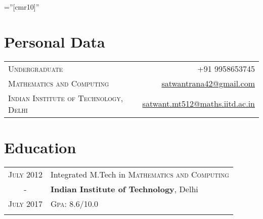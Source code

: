 \documentclass[a4paper,10pt]{article} %
\begin{document}
\pagestyle{empty} %

\font\fb=''[cmr10]'' %


\par{\bigskip\par} %

\section{Personal Data}

\begin{tabular}{lr}
\textsc{Undergraduate} &\textsc{+91 9958653745}\\
\textsc{Mathematics and Computing } & \href{mailto:satwantrana42@gmail.com}{satwantrana42@gmail.com}\\
\textsc{Indian Institute of Technology, Delhi\ \ \ \ \ \ \ \ \ \ \ \ \ \ \ \ } & \href{mailto:satwant.mt512@maths.iitd.ac.in}{satwant.mt512@maths.iitd.ac.in}
\end{tabular}


\section{Education}

\begin{tabular}{cl}	

\textsc{July} 2012 & Integrated M.Tech in \textsc{}\textsc{Mathematics and Computing} \\
- &\textbf{Indian Institute of Technology}, Delhi\\
\textsc{July} 2017 &\normalsize \textsc{Gpa}: 8.6/10.0 \\
&\\

\end{tabular}

\end{document}
